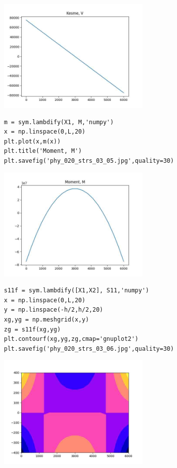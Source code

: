 \documentclass[12pt,fleqn]{article}\usepackage{../../common}
\begin{document}
\includegraphics[width=20em]{phy_020_strs_03_04.jpg}

\begin{verbatim}
m = sym.lambdify(X1, M,'numpy')
x = np.linspace(0,L,20)
plt.plot(x,m(x))
plt.title('Moment, M')
plt.savefig('phy_020_strs_03_05.jpg',quality=30)
\end{verbatim}

\includegraphics[width=20em]{phy_020_strs_03_05.jpg}

\begin{verbatim}
s11f = sym.lambdify([X1,X2], S11,'numpy')
x = np.linspace(0,L,20)
y = np.linspace(-h/2,h/2,20)
xg,yg = np.meshgrid(x,y)
zg = s11f(xg,yg)
plt.contourf(xg,yg,zg,cmap='gnuplot2')
plt.savefig('phy_020_strs_03_06.jpg',quality=30)
\end{verbatim}

\includegraphics[width=20em]{phy_020_strs_03_06.jpg}
\end{document}
